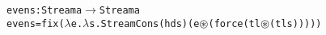 \begin{alltt}
evens : Stream a \(\rightarrow\) Stream a
evens = fix(\(\lambda\)e.\(\lambda\)s. StreamCons (hd s) (e \(\circledast\) (force (tl \(\circledast\) (tl s)))))
\end{alltt}
